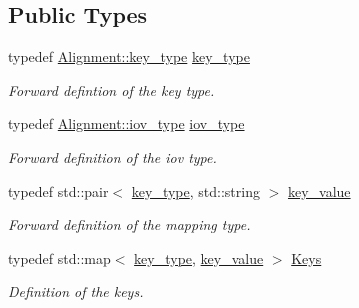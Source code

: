 \subsection*{Public Types}
\begin{DoxyCompactItemize}
\item 
typedef \hyperlink{class_d_d4hep_1_1_alignments_1_1_alignment_ab824a65f935a0c79b9ea1a7a85014b88}{Alignment\+::key\+\_\+type} \hyperlink{class_d_d4hep_1_1_alignments_1_1_interna_1_1_alignment_container_a7395f0e25d9e524d2a2bd7df0f4364e6}{key\+\_\+type}
\begin{DoxyCompactList}\small\item\em Forward defintion of the key type. \end{DoxyCompactList}\item 
typedef \hyperlink{class_d_d4hep_1_1_alignments_1_1_alignment_afd988c803da5a514d8fa255784f29462}{Alignment\+::iov\+\_\+type} \hyperlink{class_d_d4hep_1_1_alignments_1_1_interna_1_1_alignment_container_a99b2a8d269ecefcf1b59269ad94e75e3}{iov\+\_\+type}
\begin{DoxyCompactList}\small\item\em Forward definition of the iov type. \end{DoxyCompactList}\item 
typedef std\+::pair$<$ \hyperlink{class_d_d4hep_1_1_alignments_1_1_interna_1_1_alignment_container_a7395f0e25d9e524d2a2bd7df0f4364e6}{key\+\_\+type}, std\+::string $>$ \hyperlink{class_d_d4hep_1_1_alignments_1_1_interna_1_1_alignment_container_a64a96ad5b67f6e67b12fd3aaaa8bbcb8}{key\+\_\+value}
\begin{DoxyCompactList}\small\item\em Forward definition of the mapping type. \end{DoxyCompactList}\item 
typedef std\+::map$<$ \hyperlink{class_d_d4hep_1_1_alignments_1_1_interna_1_1_alignment_container_a7395f0e25d9e524d2a2bd7df0f4364e6}{key\+\_\+type}, \hyperlink{class_d_d4hep_1_1_alignments_1_1_interna_1_1_alignment_container_a64a96ad5b67f6e67b12fd3aaaa8bbcb8}{key\+\_\+value} $>$ \hyperlink{class_d_d4hep_1_1_alignments_1_1_interna_1_1_alignment_container_a3fc62784c22ba44d9ac63c424ec55799}{Keys}
\begin{DoxyCompactList}\small\item\em Definition of the keys. \end{DoxyCompactList}\end{DoxyCompactItemize}
